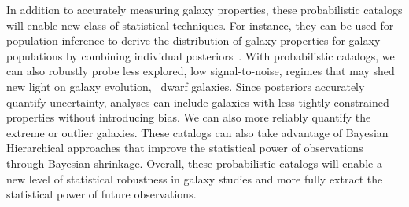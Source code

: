 In addition to accurately measuring galaxy properties, these probabilistic
catalogs will enable new class of statistical techniques.
For instance, they can be used for population inference to derive the
distribution of galaxy properties for galaxy populations by combining
individual posteriors~\citep[\eg][]{leja2019a}.
With probabilistic catalogs, we can also robustly probe less explored, low
signal-to-noise, regimes that may shed new light on galaxy evolution, 
\eg~dwarf galaxies.
Since posteriors accurately quantify uncertainty, analyses can include galaxies
with less tightly constrained properties without introducing bias. 
We can also more reliably quantify the extreme or outlier galaxies.
These catalogs can also take advantage of Bayesian Hierarchical approaches that
improve the statistical power of observations through Bayesian shrinkage. 
Overall, these probabilistic catalogs will enable a new level of statistical
robustness in galaxy studies and more fully extract the statistical power of
future observations. 

